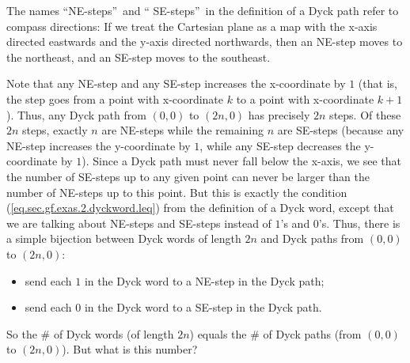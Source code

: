 The names \textquotedblleft NE-steps\textquotedblright\ and \textquotedblleft
SE-steps\textquotedblright\ in the definition of a Dyck path refer to compass
directions: If we treat the Cartesian plane as a map with the x-axis directed
eastwards and the y-axis directed northwards, then an NE-step moves to the
northeast, and an SE-step moves to the southeast.

Note that any NE-step and any SE-step increases the x-coordinate by $1$ (that
is, the step goes from a point with x-coordinate $k$ to a point with
x-coordinate $k+1$). Thus, any Dyck path from $\left(  0,0\right)  $ to
$\left(  2n,0\right)  $ has precisely $2n$ steps. Of these $2n$ steps, exactly
$n$ are NE-steps while the remaining $n$ are SE-steps (because any NE-step
increases the y-coordinate by $1$, while any SE-step decreases the
y-coordinate by $1$). Since a Dyck path must never fall below the x-axis, we
see that the number of SE-steps up to any given point can never be larger than
the number of NE-steps up to this point. But this is exactly the condition
(\ref{eq.sec.gf.exas.2.dyckword.leq}) from the definition of a Dyck word,
except that we are talking about NE-steps and SE-steps instead of $1$'s and
$0$'s. Thus, there is a simple bijection between Dyck words of length $2n$ and
Dyck paths from $\left(  0,0\right)  $ to $\left(  2n,0\right)  $:

\begin{itemize}
\item send each $1$ in the Dyck word to a NE-step in the Dyck path;

\item send each $0$ in the Dyck word to a SE-step in the Dyck path.
\end{itemize}

So the \# of Dyck words (of length $2n$) equals the \# of Dyck paths (from
$\left(  0,0\right)  $ to $\left(  2n,0\right)  $). But what is this number?

